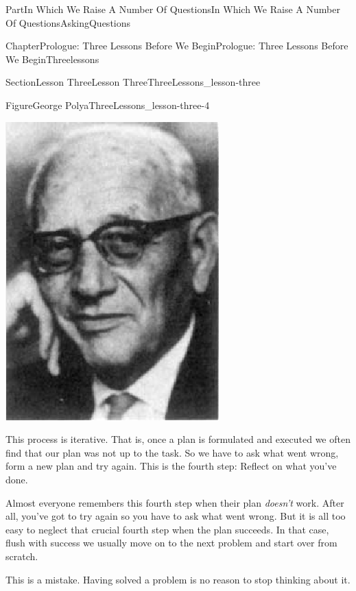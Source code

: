 \documentclass[oneside,10pt,]{book}
\numberwithin{equation}{part}
\begin{document}
\begin{partptx}{Part}{In Which We Raise A Number Of Questions}{}{In Which We Raise A Number Of Questions}{}{}{AskingQuestions}
\begin{chapterptx}{Chapter}{Prologue: Three Lessons Before We Begin}{}{Prologue: Three Lessons Before We Begin}{}{}{Threelessons}
\begin{sectionptx}{Section}{Lesson Three}{}{Lesson Three}{}{}{ThreeLessons_lesson-three}
\begin{figureptx}{Figure}{George Polya}{ThreeLessons_lesson-three-4}{}
\begin{image}{0.325}{0.35}{0.325}{}
\includegraphics[width=\linewidth]{external/images/Polya.png}
\end{image}%
\tcblower
\end{figureptx}%
This process is iterative.  That is, once a plan is formulated and executed we often find that our plan was not up to the task. So we have to ask what went wrong, form a new plan and try again.  This is the fourth step: Reflect on what you've done.%
\par
Almost everyone remembers this fourth step when their plan \emph{doesn't} work.  After all, you've got to try again so you have to ask what went wrong.  But it is all too easy to neglect that crucial fourth step when the plan succeeds.  In that case, flush with success we usually move on to the next problem and start over from scratch.%
\par
This is a mistake.  Having solved a problem is no reason to stop thinking about it.%

\end{sectionptx}
\end{chapterptx}
\end{partptx}
\end{document}
